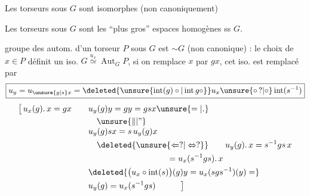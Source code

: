 
Les torseurs sous $G$ sont isomorphes (non canoniquement)

Les torseurs sous $G$ sont les ``plus gros'' espaces homogènes ss $G$.

 groupe des autom. d'un torseur $P$ sous $G$ est $\sim G$ (non canonique) : le choix de $x\in P$ définit un iso. $G\overset{u_x}{\simeq}\operatorname{Aut}_{G}P$, si on remplace $x$ par $gx$, cet iso. est remplacé par
\[
\boxed{u_y=u_{\unsure{g|s}x}=\deleted{\unsure{\operatorname{int}(g)\circ|\operatorname{int}g\circ}}u_x\unsure{\circ\,?|\circ}\operatorname{int}(s^{-1})}
\]
{\small
\[
\begin{aligned}
\bigl[\,u_x(g).\,x=gx\qquad &u_y(g)y=gy=gsx\unsure{=|.}\\
&\quad\unsure{\Vert|\text{''}}\\[-3pt]
&u_y(g)sx=s\,u_y(g)x
\\
&\hspace{1em}\deleted{\unsure{\Leftarrow ?|\Leftrightarrow ?}} \qquad u_y(g).\,x=s^{-1}gs\,x\\
&\hspace{9.4em}=u_x(s^{-1}gs).\,x\\
&\deleted{\bigl(u_x\circ\operatorname{int}(s)\bigr)(g)y=u_x(sgs^{-1})(y)=}\\
&u_y(g)=u_x(s^{-1}gs)\hspace{3em}\bigr]
\end{aligned}
\]}
